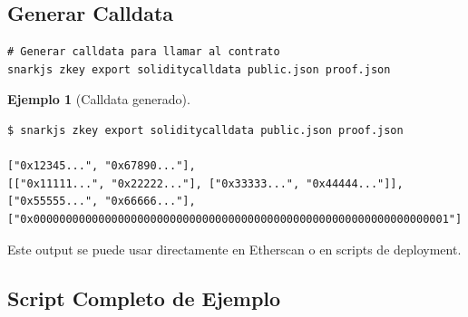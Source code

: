 \documentclass[11pt,a4paper,twoside,openright]{book}
\theoremstyle{definition}
\newtheorem{example}{Ejemplo}[chapter]
\theoremstyle{plain}
\theoremstyle{remark}
\begin{document}
\subsection{Generar Calldata}

\begin{verbatim}
# Generar calldata para llamar al contrato
snarkjs zkey export soliditycalldata public.json proof.json
\end{verbatim}

\begin{example}[Calldata generado]
\begin{verbatim}
$ snarkjs zkey export soliditycalldata public.json proof.json

["0x12345...", "0x67890..."],
[["0x11111...", "0x22222..."], ["0x33333...", "0x44444..."]],
["0x55555...", "0x66666..."],
["0x0000000000000000000000000000000000000000000000000000000000000001"]
\end{verbatim}

Este output se puede usar directamente en Etherscan o en scripts de deployment.
\end{example}

\subsection{Script Completo de Ejemplo}
\end{document}
